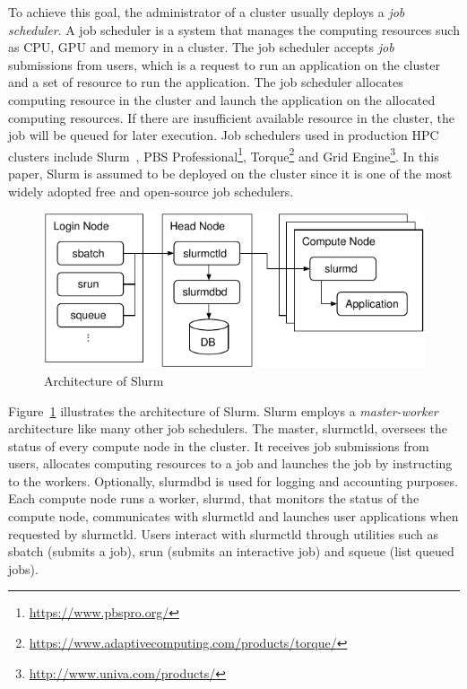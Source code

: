 \documentclass[graybox]{svmult}
\begin{document}
To achieve this goal, the administrator of a cluster usually deploys a
\textit{job scheduler}. A job scheduler is a system that manages the computing
resources such as CPU, GPU and memory in a cluster. The job scheduler accepts
\textit{job} submissions from users, which is a request to run an application
on the cluster and a set of resource to run the application. The job scheduler
allocates computing resource in the cluster and launch the application on the
allocated computing resources. If there are insufficient available resource in
the cluster, the job will be queued for later execution. Job schedulers used
in production HPC clusters include Slurm~\cite{Yoo2003}, PBS
Professional\footnote{\url{https://www.pbspro.org/}},
Torque\footnote{\url{https://www.adaptivecomputing.com/products/torque/}} and
Grid Engine\footnote{\url{http://www.univa.com/products/}}. In this paper,
Slurm is assumed to be deployed on the cluster since it is one of the most
widely adopted free and open-source job schedulers.

\begin{figure}
    \centering
    \includegraphics{slurm}
    \caption{Architecture of Slurm}%
    \label{kt:fig:slurm}
\end{figure}

Figure~\ref{kt:fig:slurm} illustrates the architecture of Slurm. Slurm employs
a \textit{master-worker} architecture like many other job schedulers. The
master, slurmctld, oversees the status of every compute node in the cluster.
It receives job submissions from users, allocates computing resources to a job
and launches the job by instructing to the workers. Optionally, slurmdbd is
used for logging and accounting purposes. Each compute node runs a worker,
slurmd, that monitors the status of the compute node, communicates with
slurmctld and launches user applications when requested by slurmctld. Users
interact with slurmctld through utilities such as sbatch (submits a job), srun
(submits an interactive job) and squeue (list queued jobs).
\end{document}
